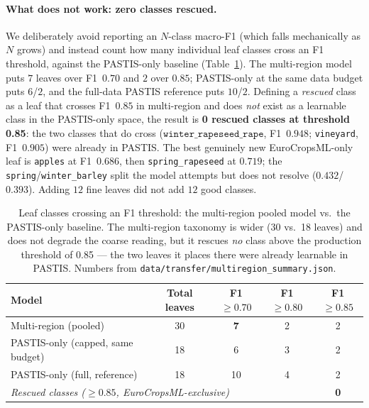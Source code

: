 \paragraph{What does not work: zero classes rescued.}
We deliberately avoid reporting an $N$-class macro-F1 (which falls mechanically as $N$
grows) and instead count how many individual leaf classes cross an F1 threshold, against the
PASTIS-only baseline (Table~\ref{tab:multiregion_threshold}). The multi-region model puts
$7$ leaves over F1~$0.70$ and $2$ over $0.85$; PASTIS-only at the same data budget puts
$6$/$2$, and the full-data PASTIS reference puts $10$/$2$. Defining a \emph{rescued} class as
a leaf that crosses F1~$0.85$ in multi-region and does \emph{not} exist as a learnable class
in the PASTIS-only space, the result is \textbf{0 rescued classes at threshold 0.85}: the two
classes that do cross ($\texttt{winter\_rapeseed\_rape}$, F1~$0.948$; \texttt{vineyard},
F1~$0.905$) were already in PASTIS. The best genuinely new EuroCropsML-only leaf is
\texttt{apples} at F1~$0.686$, then \texttt{spring\_rapeseed} at $0.719$; the
\texttt{spring}/\texttt{winter\_barley} split the model attempts but does not resolve
($0.432$/$0.393$). Adding $12$ fine leaves did not add $12$ good classes.

\begin{table}[t]
  \centering
  \caption{Leaf classes crossing an F1 threshold: the multi-region pooled model vs.\ the
  PASTIS-only baseline. The multi-region taxonomy is wider (30 vs.\ 18 leaves) and does not
  degrade the coarse reading, but it rescues \emph{no} class above the production threshold
  of 0.85 --- the two leaves it places there were already learnable in PASTIS. Numbers from
  \texttt{data/transfer/multiregion\_summary.json}.}
  \label{tab:multiregion_threshold}
  \begin{tabular}{lcccc}
    \toprule
    Model & Total leaves & F1$\ge0.70$ & F1$\ge0.80$ & F1$\ge0.85$ \\
    \midrule
    Multi-region (pooled)            & 30 & \textbf{7} & 2 & 2 \\
    PASTIS-only (capped, same budget) & 18 & 6 & 3 & 2 \\
    PASTIS-only (full, reference)     & 18 & 10 & 4 & 2 \\
    \midrule
    \multicolumn{4}{l}{\emph{Rescued classes ($\ge0.85$, EuroCropsML-exclusive)}} & \textbf{0} \\
    \bottomrule
  \end{tabular}
\end{table}

